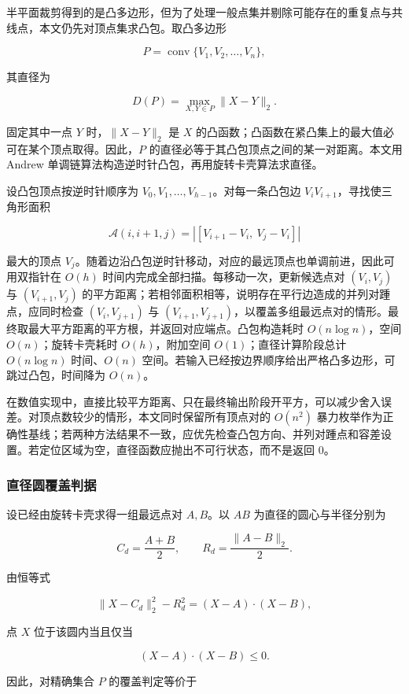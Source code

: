 半平面裁剪得到的是凸多边形，但为了处理一般点集并剔除可能存在的重复点与共线点，本文仍先对顶点集求凸包。取凸多边形

\[
P=\operatorname{conv}\{V_1,V_2,\ldots,V_n\},
\]

其直径为

\[
D(P)=\max_{X,Y\in P}\lVert X-Y\rVert_2.
\]

固定其中一点 $Y$ 时，$\lVert X-Y\rVert_2$ 是 $X$ 的凸函数；凸函数在紧凸集上的最大值必可在某个顶点取得。因此，$P$ 的直径必等于其凸包顶点之间的某一对距离。本文用 Andrew 单调链算法构造逆时针凸包，再用旋转卡壳算法求直径\cite{toussaint2014}。

设凸包顶点按逆时针顺序为 $V_0,V_1,\ldots,V_{h-1}$。对每一条凸包边 $V_iV_{i+1}$，寻找使三角形面积

\[
\mathcal A(i,i+1,j)
=
\left|
\left[V_{i+1}-V_i,\ V_j-V_i\right]
\right|
\]

最大的顶点 $V_j$。随着边沿凸包逆时针移动，对应的最远顶点也单调前进，因此可用双指针在 $O(h)$ 时间内完成全部扫描。每移动一次，更新候选点对 $(V_i,V_j)$ 与 $(V_{i+1},V_j)$ 的平方距离；若相邻面积相等，说明存在平行边造成的并列对踵点，应同时检查 $(V_i,V_{j+1})$ 与 $(V_{i+1},V_{j+1})$，以覆盖多组最远点对的情形。最终取最大平方距离的平方根，并返回对应端点。凸包构造耗时 $O(n\log n)$，空间 $O(n)$；旋转卡壳耗时 $O(h)$，附加空间 $O(1)$；直径计算阶段总计 $O(n\log n)$ 时间、$O(n)$ 空间。若输入已经按边界顺序给出严格凸多边形，可跳过凸包，时间降为 $O(n)$。

在数值实现中，直接比较平方距离、只在最终输出阶段开平方，可以减少舍入误差。对顶点数较少的情形，本文同时保留所有顶点对的 $O(n^2)$ 暴力枚举作为正确性基线；若两种方法结果不一致，应优先检查凸包方向、并列对踵点和容差设置。若定位区域为空，直径函数应抛出不可行状态，而不是返回 $0$。

\subsubsection{直径圆覆盖判据}

设已经由旋转卡壳求得一组最远点对 $A,B$。以 $AB$ 为直径的圆心与半径分别为

\[
C_d=\frac{A+B}{2},\qquad R_d=\frac{\lVert A-B\rVert_2}{2}.
\]

由恒等式

\[
\lVert X-C_d\rVert_2^2-R_d^2=(X-A)\cdot(X-B),
\]

点 $X$ 位于该圆内当且仅当

\[
(X-A)\cdot(X-B)\le0.
\]

因此，对精确集合 $P$ 的覆盖判定等价于


